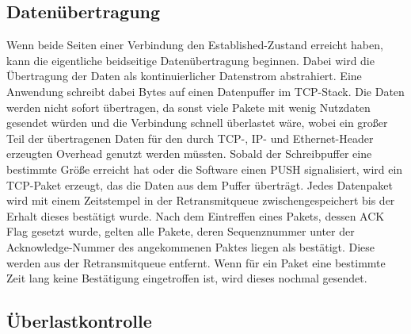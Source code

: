 \subsection{Datenübertragung}

Wenn beide Seiten einer Verbindung den Established-Zustand erreicht haben, kann die eigentliche beidseitige Datenübertragung beginnen. Dabei wird die Übertragung der Daten als kontinuierlicher Datenstrom abstrahiert. Eine Anwendung schreibt dabei Bytes auf einen Datenpuffer im TCP-Stack. Die Daten werden nicht sofort übertragen, da sonst viele Pakete mit wenig Nutzdaten gesendet würden und die Verbindung schnell überlastet wäre, wobei ein großer Teil der übertragenen Daten für den durch TCP-, IP- und Ethernet-Header erzeugten Overhead genutzt werden müssten. Sobald der Schreibpuffer eine bestimmte Größe erreicht hat oder die Software einen PUSH signalisiert, wird ein TCP-Paket erzeugt, das die Daten aus dem Puffer überträgt. Jedes Datenpaket wird mit einem Zeitstempel in der Retransmitqueue zwischengespeichert bis der Erhalt dieses bestätigt wurde. Nach dem Eintreffen eines Pakets, dessen ACK Flag gesetzt wurde, gelten alle Pakete, deren Sequenznummer unter der Acknowledge-Nummer des angekommenen Paktes liegen als bestätigt. Diese werden aus der Retransmitqueue entfernt. Wenn für ein Paket eine bestimmte Zeit lang keine Bestätigung eingetroffen ist, wird dieses nochmal gesendet. 

\subsection{Überlastkontrolle}

